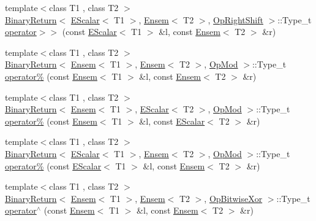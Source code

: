 \begin{DoxyCompactItemize}
\item 
{\footnotesize template$<$class T1 , class T2 $>$ }\\\mbox{\hyperlink{structENSEM_1_1BinaryReturn}{Binary\+Return}}$<$ \mbox{\hyperlink{classENSEM_1_1EScalar}{E\+Scalar}}$<$ T1 $>$, \mbox{\hyperlink{classENSEM_1_1Ensem}{Ensem}}$<$ T2 $>$, \mbox{\hyperlink{structENSEM_1_1OpRightShift}{Op\+Right\+Shift}} $>$\+::Type\+\_\+t \mbox{\hyperlink{group__eensem_ga8dbc329d9b31f5c8d7f4c54f10ea370b}{operator$>$$>$}} (const \mbox{\hyperlink{classENSEM_1_1EScalar}{E\+Scalar}}$<$ T1 $>$ \&l, const \mbox{\hyperlink{classENSEM_1_1Ensem}{Ensem}}$<$ T2 $>$ \&r)
\item 
{\footnotesize template$<$class T1 , class T2 $>$ }\\\mbox{\hyperlink{structENSEM_1_1BinaryReturn}{Binary\+Return}}$<$ \mbox{\hyperlink{classENSEM_1_1Ensem}{Ensem}}$<$ T1 $>$, \mbox{\hyperlink{classENSEM_1_1Ensem}{Ensem}}$<$ T2 $>$, \mbox{\hyperlink{structENSEM_1_1OpMod}{Op\+Mod}} $>$\+::Type\+\_\+t \mbox{\hyperlink{group__eensem_gaf077fbdf11a765fcbfe7fbb3b9e94a02}{operator\%}} (const \mbox{\hyperlink{classENSEM_1_1Ensem}{Ensem}}$<$ T1 $>$ \&l, const \mbox{\hyperlink{classENSEM_1_1Ensem}{Ensem}}$<$ T2 $>$ \&r)
\item 
{\footnotesize template$<$class T1 , class T2 $>$ }\\\mbox{\hyperlink{structENSEM_1_1BinaryReturn}{Binary\+Return}}$<$ \mbox{\hyperlink{classENSEM_1_1Ensem}{Ensem}}$<$ T1 $>$, \mbox{\hyperlink{classENSEM_1_1EScalar}{E\+Scalar}}$<$ T2 $>$, \mbox{\hyperlink{structENSEM_1_1OpMod}{Op\+Mod}} $>$\+::Type\+\_\+t \mbox{\hyperlink{group__eensem_gac6f1dfc7f3ac04dea5a10016a1cf8994}{operator\%}} (const \mbox{\hyperlink{classENSEM_1_1Ensem}{Ensem}}$<$ T1 $>$ \&l, const \mbox{\hyperlink{classENSEM_1_1EScalar}{E\+Scalar}}$<$ T2 $>$ \&r)
\item 
{\footnotesize template$<$class T1 , class T2 $>$ }\\\mbox{\hyperlink{structENSEM_1_1BinaryReturn}{Binary\+Return}}$<$ \mbox{\hyperlink{classENSEM_1_1EScalar}{E\+Scalar}}$<$ T1 $>$, \mbox{\hyperlink{classENSEM_1_1Ensem}{Ensem}}$<$ T2 $>$, \mbox{\hyperlink{structENSEM_1_1OpMod}{Op\+Mod}} $>$\+::Type\+\_\+t \mbox{\hyperlink{group__eensem_ga00d0a959bef6d8cd4aa976de1482281d}{operator\%}} (const \mbox{\hyperlink{classENSEM_1_1EScalar}{E\+Scalar}}$<$ T1 $>$ \&l, const \mbox{\hyperlink{classENSEM_1_1Ensem}{Ensem}}$<$ T2 $>$ \&r)
\item 
{\footnotesize template$<$class T1 , class T2 $>$ }\\\mbox{\hyperlink{structENSEM_1_1BinaryReturn}{Binary\+Return}}$<$ \mbox{\hyperlink{classENSEM_1_1Ensem}{Ensem}}$<$ T1 $>$, \mbox{\hyperlink{classENSEM_1_1Ensem}{Ensem}}$<$ T2 $>$, \mbox{\hyperlink{structENSEM_1_1OpBitwiseXor}{Op\+Bitwise\+Xor}} $>$\+::Type\+\_\+t \mbox{\hyperlink{group__eensem_gac8825f09186c8e0f8550839946bf2d37}{operator$^\wedge$}} (const \mbox{\hyperlink{classENSEM_1_1Ensem}{Ensem}}$<$ T1 $>$ \&l, const \mbox{\hyperlink{classENSEM_1_1Ensem}{Ensem}}$<$ T2 $>$ \&r)

\end{DoxyCompactItemize}
